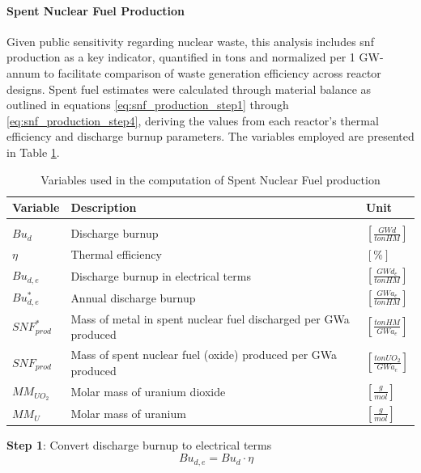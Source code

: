 \paragraph{Spent Nuclear Fuel Production}
Given public sensitivity regarding nuclear waste, this analysis includes \gls{snf} production as a key indicator, quantified in tons and normalized per 1 GW-annum to facilitate comparison of waste generation efficiency across reactor designs. Spent fuel estimates were calculated through material balance as outlined in equations \ref{eq:snf_production_step1} through \ref{eq:snf_production_step4}, deriving the values from each reactor's thermal efficiency and discharge burnup parameters. The variables employed are presented in Table \ref{tab:snf_variables}.

\begin{table}[H]
    \centering
    \begin{tabularx}{\textwidth}{lXl}
        \textbf{Variable} & \textbf{Description} & \textbf{Unit} \\\hline\\[-9px]
        $Bu_d$ & Discharge burnup & $\left[\frac{GWd}{tonHM}\right]$ \\[2px]
        $\eta$ & Thermal efficiency & $[\%]$ \\[2px]
        $Bu_{d,e}$ & Discharge burnup in electrical terms & $\left[\frac{GWd_e}{tonHM}\right]$ \\[2px]
        $ Bu_{d,e}^* $ & Annual discharge burnup & $\left[\frac{GWa_e}{tonHM}\right]$ \\[2px]
        $ SNF_{prod}^* $ & Mass of metal in spent nuclear fuel discharged per GWa produced & $\left[\frac{tonHM}{GWa_e}\right]$ \\[2px]
        $ SNF_{prod} $ & Mass of spent nuclear fuel (oxide) produced per GWa produced & $\left[\frac{tonUO_2}{GWa_e}\right]$ \\
        $ MM_{UO_2} $ & Molar mass of uranium dioxide & $\left[\frac{g}{mol}\right]$ \\[2px]
        $ MM_U $ & Molar mass of uranium & $\left[\frac{g}{mol}\right]$ \\[2px]
    \end{tabularx}
    \caption{Variables used in the computation of Spent Nuclear Fuel production}
    \label{tab:snf_variables}
\end{table}

\textbf{Step 1}: Convert discharge burnup to electrical terms
\begin{equation}
\label{eq:snf_production_step1}
\quad Bu_{d,e} = Bu_d \cdot \eta
\end{equation}

